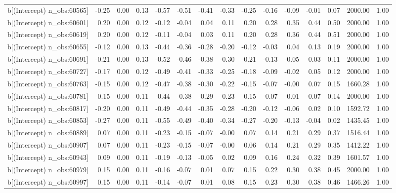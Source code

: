 \begin{table}[ht]
\begin{tabular}{rrrrrrrrrrrrrrr}
  b[(Intercept) n\_obs:60565] & -0.25 & 0.00 & 0.13 & -0.57 & -0.51 & -0.41 & -0.33 & -0.25 & -0.16 & -0.09 & -0.01 & 0.07 & 2000.00 & 1.00 \\ 
  b[(Intercept) n\_obs:60601] & 0.20 & 0.00 & 0.12 & -0.12 & -0.04 & 0.04 & 0.11 & 0.20 & 0.28 & 0.35 & 0.44 & 0.50 & 2000.00 & 1.00 \\ 
  b[(Intercept) n\_obs:60619] & 0.20 & 0.00 & 0.12 & -0.11 & -0.04 & 0.03 & 0.11 & 0.20 & 0.28 & 0.36 & 0.44 & 0.51 & 2000.00 & 1.00 \\ 
  b[(Intercept) n\_obs:60655] & -0.12 & 0.00 & 0.13 & -0.44 & -0.36 & -0.28 & -0.20 & -0.12 & -0.03 & 0.04 & 0.13 & 0.19 & 2000.00 & 1.00 \\ 
  b[(Intercept) n\_obs:60691] & -0.21 & 0.00 & 0.13 & -0.52 & -0.46 & -0.38 & -0.30 & -0.21 & -0.13 & -0.05 & 0.03 & 0.11 & 2000.00 & 1.00 \\ 
  b[(Intercept) n\_obs:60727] & -0.17 & 0.00 & 0.12 & -0.49 & -0.41 & -0.33 & -0.25 & -0.18 & -0.09 & -0.02 & 0.05 & 0.12 & 2000.00 & 1.00 \\ 
  b[(Intercept) n\_obs:60763] & -0.15 & 0.00 & 0.12 & -0.47 & -0.38 & -0.30 & -0.22 & -0.15 & -0.07 & -0.00 & 0.07 & 0.15 & 1660.28 & 1.00 \\ 
  b[(Intercept) n\_obs:60781] & -0.15 & 0.00 & 0.11 & -0.44 & -0.38 & -0.29 & -0.23 & -0.15 & -0.07 & -0.01 & 0.07 & 0.14 & 2000.00 & 1.00 \\ 
  b[(Intercept) n\_obs:60817] & -0.20 & 0.00 & 0.11 & -0.49 & -0.44 & -0.35 & -0.28 & -0.20 & -0.12 & -0.06 & 0.02 & 0.10 & 1592.72 & 1.00 \\ 
  b[(Intercept) n\_obs:60853] & -0.27 & 0.00 & 0.11 & -0.55 & -0.49 & -0.40 & -0.34 & -0.27 & -0.20 & -0.13 & -0.04 & 0.02 & 1435.45 & 1.00 \\ 
  b[(Intercept) n\_obs:60889] & 0.07 & 0.00 & 0.11 & -0.23 & -0.15 & -0.07 & -0.00 & 0.07 & 0.14 & 0.21 & 0.29 & 0.37 & 1516.44 & 1.00 \\ 
  b[(Intercept) n\_obs:60907] & 0.07 & 0.00 & 0.11 & -0.23 & -0.15 & -0.07 & -0.00 & 0.06 & 0.14 & 0.21 & 0.29 & 0.35 & 1412.22 & 1.00 \\ 
  b[(Intercept) n\_obs:60943] & 0.09 & 0.00 & 0.11 & -0.19 & -0.13 & -0.05 & 0.02 & 0.09 & 0.16 & 0.24 & 0.32 & 0.39 & 1601.57 & 1.00 \\ 
  b[(Intercept) n\_obs:60979] & 0.15 & 0.00 & 0.11 & -0.16 & -0.07 & 0.01 & 0.07 & 0.15 & 0.22 & 0.30 & 0.38 & 0.45 & 2000.00 & 1.00 \\ 
  b[(Intercept) n\_obs:60997] & 0.15 & 0.00 & 0.11 & -0.14 & -0.07 & 0.01 & 0.08 & 0.15 & 0.23 & 0.30 & 0.38 & 0.46 & 1466.26 & 1.00 \\ 

\end{tabular}
\end{table}

